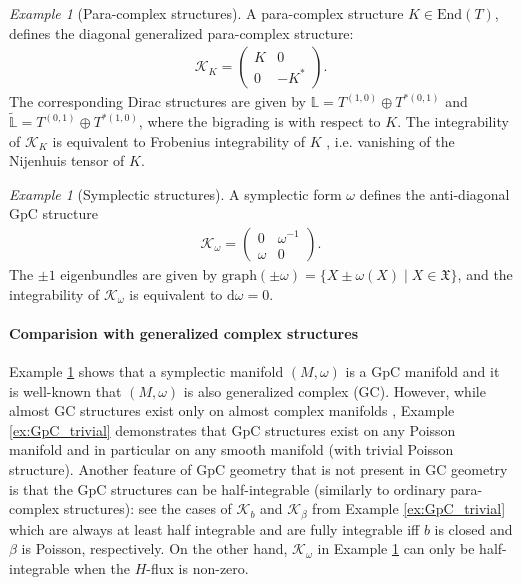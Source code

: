 \documentclass{article}
\newcommand{\KK}{\mathcal{K}}
\newcommand{\XX}{\mathfrak{X}}
\newcommand{\id}{\mathbbm{1}}
\newcommand{\rd}{\mathrm{d}}
\newcommand{\Lb}{\mathbb{L}}
\newcommand{\Endo}{\text{End}}
\theoremstyle{definition}
\theoremstyle{remark}
\newtheorem{Ex}[theorem]{Example}
\begin{document}
\begin{Ex}[Para-complex structures]
A para-complex structure $K\in \Endo(T)$, defines the diagonal generalized para-complex structure:
\begin{align*}
\KK_K=
\begin{pmatrix}
K & 0 \\
0 & -K^*
\end{pmatrix}.
\end{align*}
The corresponding Dirac structures are given by $\Lb=T^{(1,0)}\oplus T^{*(0,1)}$ and $\widetilde{\Lb}=T^{(0,1)}\oplus T^{*(1,0)}$, where the bigrading is with respect to $K$. The integrability of $\KK_K$ is equivalent to Frobenius integrability of $K$ , i.e. vanishing of the Nijenhuis tensor of $K$.
%

\end{Ex}

\begin{Ex}[Symplectic structures]\label{ex:GpC_sympl}
A symplectic form $\omega$ defines the anti-diagonal GpC structure
\begin{align*}
\KK_\omega=
\begin{pmatrix}
0 & \omega^{-1} \\
\omega & 0
\end{pmatrix}.
\end{align*}
The $\pm 1$ eigenbundles are given by $\text{graph}(\pm\omega)=\{X\pm\omega(X)\mid X\in \XX\}$, and the integrability of $\KK_\omega$ is equivalent to $\rd\omega=0$.
\end{Ex}

\paragraph{Comparision with generalized complex structures}
Example \ref{ex:GpC_sympl} shows that a symplectic manifold $(M,\omega)$ is a GpC manifold and it is well-known \cite{Gualtieri:2003dx} that $(M,\omega)$ is also generalized complex (GC). However, while almost GC structures exist only on almost complex manifolds \cite{Gualtieri:2003dx}, Example \ref{ex:GpC_trivial} demonstrates that GpC structures exist on any Poisson manifold and in particular on any smooth manifold (with trivial Poisson structure). Another feature of GpC geometry that is not present in GC geometry is that the GpC structures can be half-integrable (similarly to ordinary para-complex structures): see the cases of $\KK_b$ and $\KK_\beta$ from Example \ref{ex:GpC_trivial} which are always at least half integrable and are fully integrable iff $b$ is closed and $\beta$ is Poisson, respectively. On the other hand, $\KK_\omega$ in Example \ref{ex:GpC_sympl} can only be half-integrable when the $H$-flux is non-zero.
\end{document}
